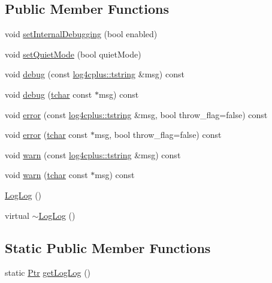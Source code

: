 \subsection*{Public Member Functions}
\begin{DoxyCompactItemize}
\item 
void \hyperlink{classlog4cplus_1_1helpers_1_1LogLog_ae7c6c1f3f6d3420f0a559f7bb58739dd}{set\-Internal\-Debugging} (bool enabled)
\item 
void \hyperlink{classlog4cplus_1_1helpers_1_1LogLog_a65dd0110aa55acd1a1f09676c648d0d2}{set\-Quiet\-Mode} (bool quiet\-Mode)
\item 
void \hyperlink{classlog4cplus_1_1helpers_1_1LogLog_aeacb62b649afe387fae20dae2b3f4baa}{debug} (const \hyperlink{namespacelog4cplus_a3c9287f6ebcddc50355e29d71152117b}{log4cplus\-::tstring} \&msg) const 
\item 
void \hyperlink{classlog4cplus_1_1helpers_1_1LogLog_a9bdee99fb858df4b4b0cafc4e3afea73}{debug} (\hyperlink{namespacelog4cplus_a7b80b5711ae9e7a1ddd97dbaefbe3583}{tchar} const $\ast$msg) const 
\item 
void \hyperlink{classlog4cplus_1_1helpers_1_1LogLog_ad78b72723a90a0ef06118c53626324bd}{error} (const \hyperlink{namespacelog4cplus_a3c9287f6ebcddc50355e29d71152117b}{log4cplus\-::tstring} \&msg, bool throw\-\_\-flag=false) const 
\item 
void \hyperlink{classlog4cplus_1_1helpers_1_1LogLog_acfaeab7e316768e00391072d65b3de1e}{error} (\hyperlink{namespacelog4cplus_a7b80b5711ae9e7a1ddd97dbaefbe3583}{tchar} const $\ast$msg, bool throw\-\_\-flag=false) const 
\item 
void \hyperlink{classlog4cplus_1_1helpers_1_1LogLog_aeb05fae49010165510c40cfa1bafd956}{warn} (const \hyperlink{namespacelog4cplus_a3c9287f6ebcddc50355e29d71152117b}{log4cplus\-::tstring} \&msg) const 
\item 
void \hyperlink{classlog4cplus_1_1helpers_1_1LogLog_aa6438bd8610739a7646336ed5a85104b}{warn} (\hyperlink{namespacelog4cplus_a7b80b5711ae9e7a1ddd97dbaefbe3583}{tchar} const $\ast$msg) const 
\item 
\hyperlink{classlog4cplus_1_1helpers_1_1LogLog_aab6830e98c7b668ee55ae478f531ff3f}{Log\-Log} ()
\item 
virtual \hyperlink{classlog4cplus_1_1helpers_1_1LogLog_a75e21ac0aa4459655bd76c03389b8689}{$\sim$\-Log\-Log} ()
\end{DoxyCompactItemize}
\subsection*{Static Public Member Functions}
\begin{DoxyCompactItemize}
\item 
static \hyperlink{classlog4cplus_1_1helpers_1_1LogLog_ac7b386006c89f28eed8c03a86311d75a}{Ptr} \hyperlink{classlog4cplus_1_1helpers_1_1LogLog_a1c24d00722bb900ca23f24a0481d03ab}{get\-Log\-Log} ()
\end{DoxyCompactItemize}


